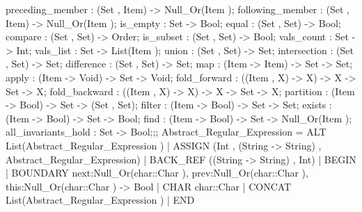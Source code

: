{{{{                                        preceding_member : (Set , Item) -> Null_Or(Item );
                                        following_member : (Set , Item) -> Null_Or(Item );
                                        is_empty : Set -> Bool;
                                        equal : (Set , Set) -> Bool;
                                        compare : (Set , Set) -> Order;
                                        is_subset : (Set , Set) -> Bool;
                                        vals_count : Set -> Int;
                                        vals_list : Set -> List(Item );
                                        union : (Set , Set) -> Set;
                                        intersection : (Set , Set) -> Set;
                                        difference : (Set , Set) -> Set;
                                        map : (Item -> Item) -> Set -> Set;
                                        apply : (Item -> Void) -> Set -> Void;
                                        fold_forward : ((Item , X) -> X) -> X -> Set -> X;
                                        fold_backward : ((Item , X) -> X) -> X -> Set -> X;
                                        partition : (Item -> Bool) -> Set -> (Set , Set);
                                        filter : (Item -> Bool) -> Set -> Set;
                                        exists : (Item -> Bool) -> Set -> Bool;
                                        find : (Item -> Bool) -> Set -> Null_Or(Item );
                                        all_invariants_hold : Set -> Bool;};;
                                Abstract_Regular_Expression
                                = ALT
                                List(Abstract_Regular_Expression )
                                |
                                ASSIGN
                                (Int , (String -> String) , Abstract_Regular_Expression)
                                |
                                BACK_REF
                                ((String -> String) , Int)
                                |
                                BEGIN
                                |
                                BOUNDARY
                                {next:Null_Or(char::Char ), prev:Null_Or(char::Char ), this:Null_Or(char::Char )} -> Bool
                                |
                                CHAR
                                char::Char
                                |
                                CONCAT
                                List(Abstract_Regular_Expression )
                                |
                                END
}}}
